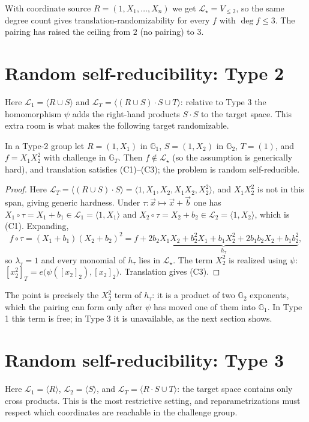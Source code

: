 \documentclass{aicr-solution}
\newcommand{\Gone}{\mathbb{G}_1}
\newcommand{\Gtwo}{\mathbb{G}_2}
\newcommand{\GT}{\mathbb{G}_T}
\newcommand{\vx}{\vec{x}}
\newcommand{\vb}{\vec{b}}
\newcommand{\LL}{\mathcal{L}}
\newcommand{\Span}[1]{\langle #1 \rangle} %
\begin{document}
With coordinate source $R=(1,X_1,\dots,X_n)$ we get $\LL_\star=V_{\le 2}$, so the same
degree count gives translation-randomizability for every $f$ with $\deg f\le 3$. The
pairing has raised the ceiling from $2$ (no pairing) to $3$.

\section{Random self-reducibility: Type 2}

Here $\LL_1=\Span{R\cup S}$ and $\LL_T=\Span{(R\cup S)\cdot S\cup T}$: relative to Type 3
the homomorphism $\psi$ adds the right-hand products $S\cdot S$ to the target space. This
extra room is what makes the following target randomizable.

\begin{proposition}
\label{prop:type2}
In a Type-2 group let $R=(1,X_1)$ in $\Gone$, $S=(1,X_2)$ in $\Gtwo$, $T=(1)$, and
$f=X_1X_2^{2}$ with challenge in $\GT$. Then $f\notin\LL_\star$ (so the assumption is
generically hard), and translation satisfies \textup{(C1)--(C3)}; the problem is random
self-reducible.
\end{proposition}
\begin{proof}
Here $\LL_T=\Span{(R\cup S)\cdot S}=\Span{1,X_1,X_2,X_1X_2,X_2^{2}}$, and $X_1X_2^{2}$ is
not in this span, giving generic hardness. Under $\tau\colon\vx\mapsto\vx+\vb$ one has
$X_1\circ\tau=X_1+b_1\in\LL_1=\Span{1,X_1}$ and $X_2\circ\tau=X_2+b_2\in\LL_2=\Span{1,X_2}$,
which is (C1). Expanding,
\[
  f\circ\tau=(X_1+b_1)(X_2+b_2)^{2}
  =f+\underbrace{2b_2X_1X_2+b_2^{2}X_1+b_1X_2^{2}+2b_1b_2X_2+b_1b_2^{2}}_{h_\tau},
\]
so $\lambda_\tau=1$ and every monomial of $h_\tau$ lies in $\LL_\star$. The term $X_2^{2}$
is realized using $\psi$: $[x_2^{2}]_T=e\bigl(\psi([x_2]_2),[x_2]_2\bigr)$. Translation gives
(C3).
\end{proof}

The point is precisely the $X_2^{2}$ term of $h_\tau$: it is a product of two $\Gtwo$
exponents, which the pairing can form only after $\psi$ has moved one of them into $\Gone$.
In Type 1 this term is free; in Type 3 it is unavailable, as the next section shows.

\section{Random self-reducibility: Type 3}
\label{sec:type3}

Here $\LL_1=\Span{R}$, $\LL_2=\Span{S}$, and $\LL_T=\Span{R\cdot S\cup T}$: the target space
contains only cross products. This is the most restrictive setting, and reparametrizations
must respect which coordinates are reachable in the challenge group.
\end{document}
